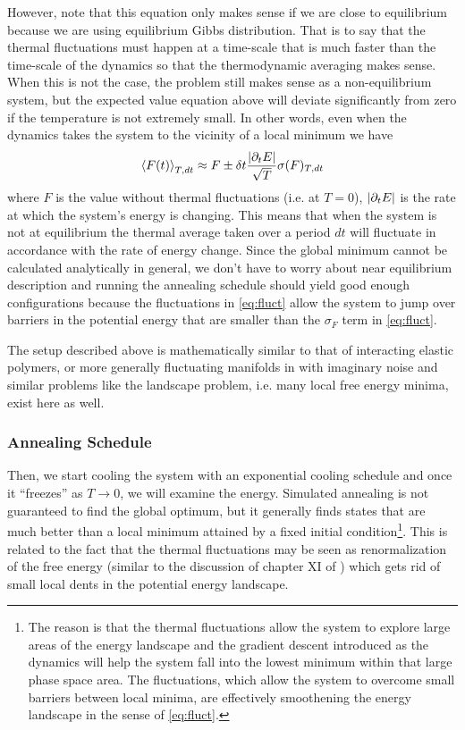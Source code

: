 \documentclass[nofootinbib,preprint,floatfix,titlepage,superscriptaddress]{revtex4} %
\begin{document}
However, note that this equation only makes sense if we are close to equilibrium because we are using equilibrium Gibbs distribution. That is to say that the thermal fluctuations must happen at a time-scale that is much faster than the time-scale of the dynamics so that the thermodynamic averaging makes sense. When this is not the case, the problem still makes sense as a non-equilibrium system, but the expected value equation above will deviate significantly from zero if the temperature is not extremely small. In other words, even when the dynamics takes the system to the vicinity of a local minimum we have 
\begin{equation}
\left<F(t)\right>_{T,dt} \approx F \pm \delta t {|\partial_t E|\over \sqrt{T}} \sigma(F)_{T,dt} \label{eq:fluct}  
\end{equation}
where $F$ is the value without thermal fluctuations (i.e. at $T=0$), $|\partial_t E|$ is the rate at which the system's energy is changing. This means that when the system is not at equilibrium the thermal average taken over a period $dt$ will fluctuate in accordance with the rate of energy change. 
Since the global minimum cannot be calculated analytically in general, we don't have to worry about near equilibrium description and running the annealing schedule should yield good enough configurations because the fluctuations in \eqref{eq:fluct} allow the system to jump over barriers in the potential energy that are smaller than the $\sigma_F$ term in \eqref{eq:fluct}. 

The setup described above is mathematically similar to that of interacting elastic polymers, or more generally fluctuating manifolds in \citep{mezard1991replica} with imaginary noise and similar problems like the landscape problem, i.e. many local free energy minima, exist here as well. 

\subsubsection{Annealing Schedule}
Then, we start cooling the system with an exponential cooling schedule and once it ``freezes'' as $T \to 0$, we will examine the energy. Simulated annealing is not guaranteed to find the global optimum, but it generally finds states that are much better than a local minimum attained by a fixed initial condition\footnote{ The reason is that the thermal fluctuations allow the system to explore large areas of the energy landscape and the gradient descent introduced as the dynamics will help the system fall into the lowest minimum within that large phase space area. The fluctuations, which allow the system to overcome small barriers between local minima, are effectively smoothening the energy landscape in the sense of \eqref{eq:fluct}. }. This is related to the fact that the thermal fluctuations may be seen as renormalization of the free energy (similar to the discussion of chapter XI of \citep{de1979scaling}) which gets rid of small local dents in the potential energy landscape.  
\end{document}
